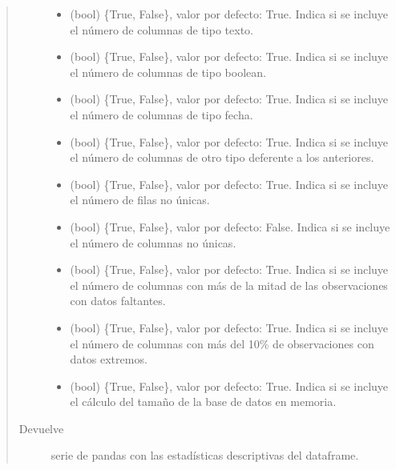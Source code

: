 \documentclass[letterpaper,10pt,openany,spanish]{sphinxmanual}
\begin{document}
\begin{fulllineitems}
\begin{quote}
\begin{description}
\begin{itemize}
\item {} 
 \textendash{} (bool) \{True, False\}, valor por defecto: True. Indica si se incluye el número de columnas de tipo texto.

\item {} 
 \textendash{} (bool) \{True, False\}, valor por defecto: True. Indica si se incluye el número de columnas de tipo boolean.

\item {} 
 \textendash{} (bool) \{True, False\}, valor por defecto: True. Indica si se incluye el número de columnas de tipo fecha.

\item {} 
 \textendash{} (bool) \{True, False\}, valor por defecto: True. Indica si se incluye el número de columnas de otro tipo deferente a los anteriores.

\item {} 
 \textendash{} (bool) \{True, False\}, valor por defecto: True. Indica si se incluye el número de filas no únicas.

\item {} 
 \textendash{} (bool) \{True, False\}, valor por defecto: False. Indica si se incluye el número de columnas no únicas.

\item {} 
 \textendash{} (bool) \{True, False\}, valor por defecto: True. Indica si se incluye el número de columnas con más de la mitad de las observaciones con datos faltantes.

\item {} 
 \textendash{} (bool) \{True, False\}, valor por defecto: True. Indica si se incluye el número de columnas con más del 10\% de observaciones con datos extremos.

\item {} 
 \textendash{} (bool) \{True, False\}, valor por defecto: True. Indica si se incluye el cálculo del tamaño de la base de datos en memoria.

\end{itemize}

\item[{Devuelve}] \leavevmode
serie de pandas con las estadísticas descriptivas del dataframe.

\end{description}\end{quote}

\end{fulllineitems}
\end{document}
